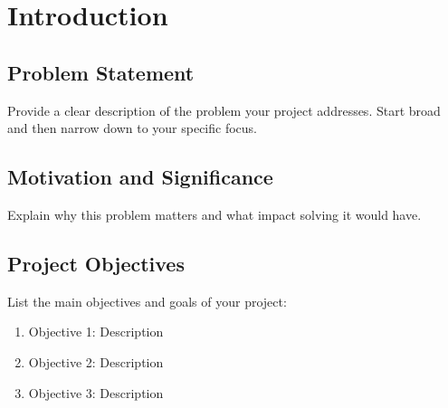 \documentclass[12pt,a4paper,onecolumn,oneside]{report}
\begin{document}
\clearpage

\tableofcontents

\clearpage

\listoffigures

\clearpage

\listoftables

\clearpage


\setcounter{page}{1}


\chapter{Introduction}
\label{chap:intro}

\section{Problem Statement}
\label{sec:intro:problem}

Provide a clear description of the problem your project addresses. Start broad and then narrow down to your specific focus.

\section{Motivation and Significance}
\label{sec:intro:motivation}

Explain why this problem matters and what impact solving it would have.

\section{Project Objectives}
\label{sec:intro:objectives}

List the main objectives and goals of your project:
\begin{enumerate}
    \item Objective 1: Description
    \item Objective 2: Description
    \item Objective 3: Description
\end{enumerate}
\end{document}
